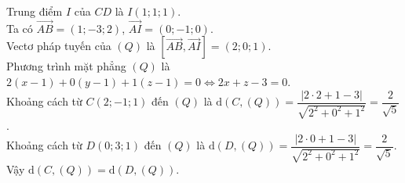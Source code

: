 \begin{ex}
{\begin{itemchoice}
			Trung điểm $I$ của $CD$ là $I(1;1;1)$.\\ 
			Ta có $\overrightarrow{AB} = (1;-3;2)$, $\overrightarrow{AI} = (0;-1;0)$.\\ 
			Vectơ pháp tuyến của $(Q)$ là  $[\overrightarrow{AB}, \overrightarrow{AI}] = (2;0;1)$.\\
			Phương  trình mặt phẳng $(Q)$ là $2(x-1)+0(y-1)+1(z-1)=0 \Leftrightarrow 2x+z-3=0$.\\
			Khoảng cách  từ $C(2;-1;1)$ đến $(Q)$ là $\mathrm{d}(C,(Q)) = \dfrac{|2\cdot 2+1-3|}{\sqrt{2^2+0^2+1^2}}= \dfrac{2}{\sqrt{5}}$.\\
			Khoảng cách từ $D(0;3;1)$ đến $(Q)$ là $\mathrm{d}(D,(Q)) = \dfrac{|2\cdot  0+1-3|}{\sqrt{2^2+0^2+1^2}}= \dfrac{2}{\sqrt{5}}$.\\
			Vậy  $\mathrm{d}(C,(Q)) = \mathrm{d}(D,(Q))$.
		\end{itemchoice}
	 }
\end{ex}

